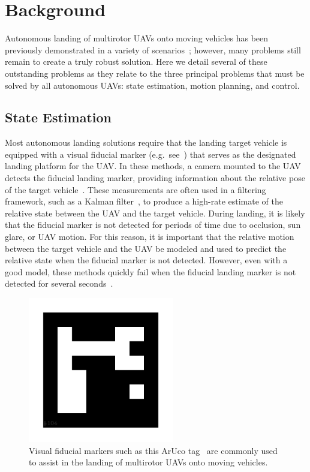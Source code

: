 \section{Background}

Autonomous landing of multirotor UAVs onto moving vehicles has been previously
demonstrated in a variety of scenarios~\cite{wynn2019visual}; however, many problems still remain to
create a truly robust solution. Here we detail several of these outstanding
problems as they relate to the three principal problems that must be solved by
all autonomous UAVs: state estimation, motion planning, and control.

\subsection{State Estimation}
Most autonomous landing solutions require that the landing target vehicle is equipped
with a visual fiducial marker (e.g.~see~)
that serves as
the designated landing platform for the UAV.
In these methods, a camera mounted to the UAV detects the fiducial landing marker, providing
information about the relative pose of the target
vehicle~\cite{borowczyk2017autonomous}. These measurements are often used in a
filtering framework, such as a Kalman filter~\cite{kalman}, to produce a
high-rate estimate of the relative state between the UAV and the target
vehicle. During landing, it is likely
that the fiducial marker is not detected for periods of time due to occlusion,
sun glare, or UAV motion. For this reason, it is important that the relative
motion between the target vehicle and the UAV be modeled and used to predict
the relative state when the fiducial marker is not detected.
However, even with a good model,
these methods quickly fail when the fiducial landing
marker is not detected for several seconds~\cite{ling2014precision}.

\begin{figure}[h]
  \centering
  \includegraphics[width=2.5in]{figures/aruco_104.png}
  \caption[Visual Fiducial Marker]{Visual fiducial markers such as this
    ArUco tag~\cite{garrido2016generation} are commonly used to assist in the
  landing of multirotor UAVs onto moving vehicles.}
  \label{fig:aruco_tag}
\end{figure}

